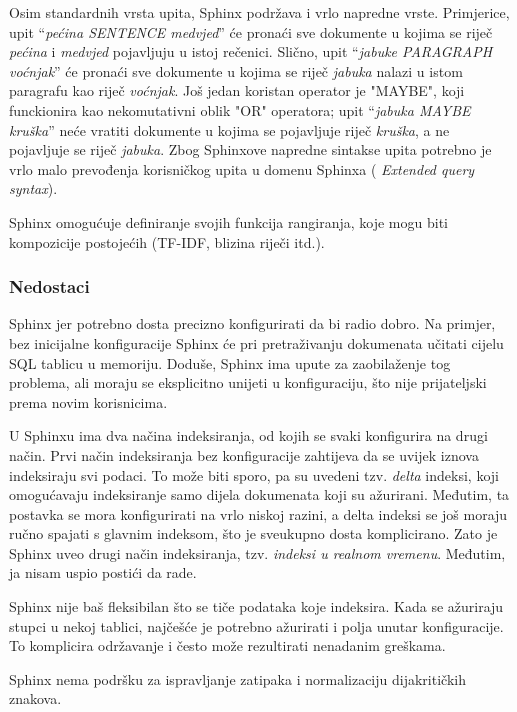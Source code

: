 \documentclass[a4paper,twoside,12pt]{scrreprt}
\begin{document}
Osim standardnih vrsta upita, Sphinx podržava i vrlo napredne vrste. Primjerice, upit ``\textit{pećina SENTENCE medvjed}'' će pronaći sve dokumente u kojima se riječ \textit{pećina} i \textit{medvjed} pojavljuju u istoj rečenici. Slično, upit ``\textit{jabuke PARAGRAPH voćnjak}'' će pronaći sve dokumente u kojima se riječ \textit{jabuka} nalazi u istom paragrafu kao riječ \textit{voćnjak}. Još jedan koristan operator je "MAYBE", koji funckionira kao nekomutativni oblik "OR" operatora; upit ``\textit{jabuka MAYBE kruška}'' neće vratiti dokumente u kojima se pojavljuje riječ \textit{kruška}, a ne pojavljuje se riječ \textit{jabuka}. Zbog Sphinxove napredne sintakse upita potrebno je vrlo malo prevođenja korisničkog upita u domenu Sphinxa (\cite{sphinx} \textit{Extended query syntax}).

Sphinx omogućuje definiranje svojih funkcija rangiranja, koje mogu biti kompozicije postojećih (TF-IDF, blizina riječi itd.).

\subsubsection{Nedostaci}

Sphinx jer potrebno dosta precizno konfigurirati da bi radio dobro. Na primjer, bez inicijalne konfiguracije Sphinx će pri pretraživanju dokumenata učitati cijelu SQL tablicu u memoriju. Doduše, Sphinx ima upute za zaobilaženje tog problema, ali moraju se eksplicitno unijeti u konfiguraciju, što nije prijateljski prema novim korisnicima.

U Sphinxu ima dva načina indeksiranja, od kojih se svaki konfigurira na drugi način. Prvi način indeksiranja bez konfiguracije zahtijeva da se uvijek iznova indeksiraju svi podaci. To može biti sporo, pa su uvedeni tzv. \textit{delta} indeksi, koji omogućavaju indeksiranje samo dijela dokumenata koji su ažurirani. Međutim, ta postavka se mora konfigurirati na vrlo niskoj razini, a delta indeksi se još moraju ručno spajati s glavnim indeksom, što je sveukupno dosta komplicirano. Zato je Sphinx uveo drugi način indeksiranja, tzv. \textit{indeksi u realnom vremenu}. Međutim, ja nisam uspio postići da rade.

Sphinx nije baš fleksibilan što se tiče podataka koje indeksira. Kada se ažuriraju stupci u nekoj tablici, najčešće je potrebno ažurirati i polja unutar konfiguracije. To komplicira održavanje i često može rezultirati nenadanim greškama.

Sphinx nema podršku za ispravljanje zatipaka i normalizaciju dijakritičkih znakova.
\end{document}
